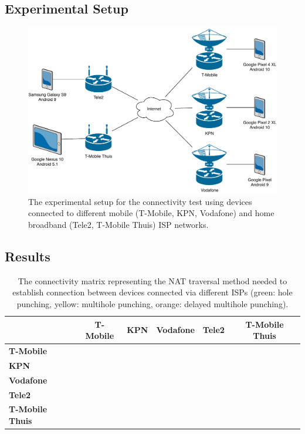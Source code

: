 \subsection{Experimental Setup}


\begin{figure}[h!]
    \includegraphics[width=\textwidth]{diagrams/experimental-setup}
    \caption{The experimental setup for the connectivity test using devices connected to different mobile (T-Mobile, KPN, Vodafone) and home broadband (Tele2, T-Mobile Thuis) ISP networks.}
    \label{ble_architecture}
\end{figure}


\subsection{Results}

\begin{table}[h!]
    \centering
    \begin{tabular}{ | l | c | c | c | c | c | }
        \hline
        \textbf{} & \textbf{T-Mobile} & \textbf{KPN} & \textbf{Vodafone} & \textbf{Tele2} & \textbf{T-Mobile Thuis} \\
        \hline
        \textbf{T-Mobile} & \cellcolor{green!25} &  &  &  &  \\
        \hline
        \textbf{KPN} & \cellcolor{green!25}& \cellcolor{green!25} &  &  &  \\
        \hline
        \textbf{Vodafone} & \cellcolor{orange!25} & \cellcolor{green!25} & \cellcolor{yellow!25} &  &  \\
        \hline
        \textbf{Tele2} & \cellcolor{green!25} & \cellcolor{green!25} & \cellcolor{green!25} & \cellcolor{green!25} & \\
        \hline
        \textbf{T-Mobile Thuis} & \cellcolor{green!25} & \cellcolor{green!25} & \cellcolor{green!25} & \cellcolor{green!25} & \cellcolor{green!25} \\
        \hline
    \end{tabular}
    \caption{The connectivity matrix representing the NAT traversal method needed to establish connection between devices connected via different ISPs (green: hole punching, yellow: multihole punching, orange: delayed multihole punching).}
    \label{table_cgnat_analysis}
\end{table}

